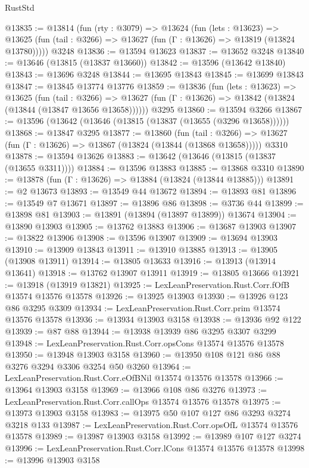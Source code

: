 \begin{lexlean}{RustStd}
\begin{coremodule}
@13835 := @13814
    (fun (rty : @3079) =>
    @13624
      (fun (lets : @13623) =>
      @13625 (fun (tail : @3266) => @13627 (fun (Γ : @13626) => @13819 (@13824 @13780)))))
    @3248
@13836 := @13594 @13623
@13837 := @13652 @3248
@13840 := @13646 (@13815 (@13837 @13660))
@13842 := @13596 (@13642 @13840)
@13843 := @13696 @3248
@13844 := @13695 @13843
@13845 := @13699 @13843
@13847 := @13845 @13774 @13776
@13859 := @13836
    (fun (lets : @13623) =>
    @13625
      (fun (tail : @3266) =>
      @13627 (fun (Γ : @13626) => @13842 (@13824 (@13844 (@13847 @13656 @13658))))))
    @3295
@13860 := @13594 @3266
@13867 := @13596 (@13642 (@13646 (@13815 (@13837 (@13655 (@3296 @13658))))))
@13868 := @13847 @3295
@13877 := @13860
    (fun (tail : @3266) => @13627 (fun (Γ : @13626) => @13867 (@13824 (@13844 (@13868 @13658)))))
    @3310
@13878 := @13594 @13626
@13883 := @13642 (@13646 (@13815 (@13837 (@13655 @3311))))
@13884 := @13596 @13883
@13885 := @13868 @3310
@13890 := @13878 (fun (Γ : @13626) => @13884 (@13824 (@13844 @13885)))
@13891 := @2 @13673
@13893 := @13549 @44 @13672
@13894 := @13893 @81
@13896 := @13549 @7 @13671
@13897 := @13896 @86
@13898 := @3736 @44
@13899 := @13898 @81
@13903 := @13891 (@13894 (@13897 @13899)) @13674
@13904 := @13890 @13903
@13905 := @13762 @13883
@13906 := @13687 @13903
@13907 := @13822 @13906
@13908 := @13596 @13907
@13909 := @13694 @13903
@13910 := @13909 @13843
@13911 := @13910 @13885
@13913 := @13905 (@13908 @13911)
@13914 := @13805 @13633
@13916 := @13913 (@13914 @13641)
@13918 := @13762 @13907 @13911
@13919 := @13805 @13666
@13921 := @13918 (@13919 @13821)
@13925 := LexLeanPreservation.Rust.Corr.fOfB @13574 @13576 @13578
@13926 := @13925 @13903
@13930 := @13926 @123 @86 @3295 @3309
@13934 := LexLeanPreservation.Rust.Corr.prim @13574 @13576 @13578
@13936 := @13934 @13903 @3158
@13938 := @13936 @92 @122
@13939 := @87 @88
@13944 := @13938 @13939 @86 @3295 @3307 @3299
@13948 := LexLeanPreservation.Rust.Corr.opsCons @13574 @13576 @13578
@13950 := @13948 @13903 @3158
@13960 := @13950 @108 @121 @86 @88 @3276 @3294 @3306 @3254 @50 @3260
@13964 := LexLeanPreservation.Rust.Corr.eOfBNil @13574 @13576 @13578
@13966 := @13964 @13903 @3158
@13969 := @13966 @108 @86 @3276
@13973 := LexLeanPreservation.Rust.Corr.callOps @13574 @13576 @13578
@13975 := @13973 @13903 @3158
@13983 := @13975 @50 @107 @127 @86 @3293 @3274 @3218 @133
@13987 := LexLeanPreservation.Rust.Corr.opsOfL @13574 @13576 @13578
@13989 := @13987 @13903 @3158
@13992 := @13989 @107 @127 @3274
@13996 := LexLeanPreservation.Rust.Corr.lCons @13574 @13576 @13578
@13998 := @13996 @13903 @3158

\end{coremodule}
\end{lexlean}
